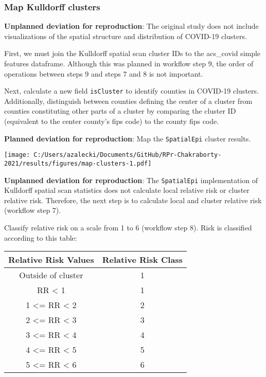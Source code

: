 \documentclass[
]{article}
\begin{document}
\hypertarget{map-kulldorff-clusters}{%
\subsubsection{Map Kulldorff clusters}\label{map-kulldorff-clusters}}

\textbf{Unplanned deviation for reproduction}: The original study does
not include visualizations of the spatial structure and distribution of
COVID-19 clusters.

First, we must join the Kulldorff spatial scan cluster IDs to the
acs\_covid simple features dataframe. Although this was planned in
workflow step 9, the order of operations between steps 9 and steps 7 and
8 is not important.

Next, calculate a new field \texttt{isCluster} to identify counties in
COVID-19 clusters. Additionally, distinguish between counties defining
the center of a cluster from counties constituting other parts of a
cluster by comparing the cluster ID (equivalent to the center county's
fips code) to the county fips code.

\textbf{Planned deviation for reproduction}: Map the \texttt{SpatialEpi}
cluster results.

\texttt{[image: C:/Users/azalecki/Documents/GitHub/RPr-Chakraborty-2021/results/figures/map-clusters-1.pdf]}

\textbf{Unplanned deviation for reproduction}: The \texttt{SpatialEpi}
implementation of Kulldorff spatial scan statistics does not calculate
local relative risk or cluster relative risk. Therefore, the next step
is to calculate local and cluster relative risk (workflow step 7).

Classify relative risk on a scale from 1 to 6 (workflow step 8). Risk is
classified according to this table:

\begin{longtable}[]{@{}cc@{}}
\toprule\noalign{}
Relative Risk Values & Relative Risk Class \\
\midrule\noalign{}
\endhead
\bottomrule\noalign{}
\endlastfoot
Outside of cluster & 1 \\
RR \textless{} 1 & 1 \\
1 \textless= RR \textless{} 2 & 2 \\
2 \textless= RR \textless{} 3 & 3 \\
3 \textless= RR \textless{} 4 & 4 \\
4 \textless= RR \textless{} 5 & 5 \\
5 \textless= RR \textless{} 6 & 6 \\
\end{longtable}
\end{document}
